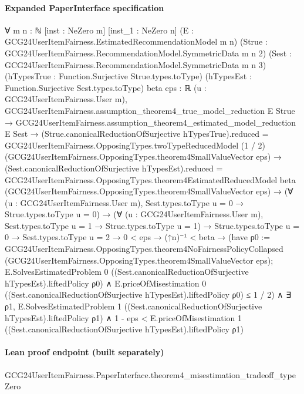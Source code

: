 \documentclass[10pt]{article}
\begin{document}
\paragraph{Expanded PaperInterface specification}
\begin{ReviewVerbatim}
∀ {m n : ℕ} [inst : NeZero m] [inst_1 : NeZero n] (E : GCG24UserItemFairness.EstimatedRecommendationModel m n)
  (Strue : GCG24UserItemFairness.RecommendationModel.SymmetricData m n 2)
  (Sest : GCG24UserItemFairness.RecommendationModel.SymmetricData m n 3)
  (hTypesTrue : Function.Surjective Strue.types.toType) (hTypesEst : Function.Surjective Sest.types.toType)
  {beta eps : ℝ} (u : GCG24UserItemFairness.User m),
  GCG24UserItemFairness.assumption_theorem4_true_model_reduction E Strue →
    GCG24UserItemFairness.assumption_theorem4_estimated_model_reduction E Sest →
      (Strue.canonicalReductionOfSurjective hTypesTrue).reduced =
          GCG24UserItemFairness.OpposingTypes.twoTypeReducedModel (1 / 2)
            (GCG24UserItemFairness.OpposingTypes.theorem4SmallValueVector eps) →
        (Sest.canonicalReductionOfSurjective hTypesEst).reduced =
            GCG24UserItemFairness.OpposingTypes.theorem4EstimatedReducedModel beta
              (GCG24UserItemFairness.OpposingTypes.theorem4SmallValueVector eps) →
          (∀ (u : GCG24UserItemFairness.User m), Sest.types.toType u = 0 → Strue.types.toType u = 0) →
            (∀ (u : GCG24UserItemFairness.User m), Sest.types.toType u = 1 → Strue.types.toType u = 1) →
              Strue.types.toType u = 0 →
                Sest.types.toType u = 2 →
                  0 < eps →
                    (↑n)⁻¹ < beta →
                      (have ρ0 :=
                          GCG24UserItemFairness.OpposingTypes.theorem4NoFairnessPolicyCollapsed
                            (GCG24UserItemFairness.OpposingTypes.theorem4SmallValueVector eps);
                        E.SolvesEstimatedProblem 0 ((Sest.canonicalReductionOfSurjective hTypesEst).liftedPolicy ρ0) ∧
                          E.priceOfMisestimation 0 ((Sest.canonicalReductionOfSurjective hTypesEst).liftedPolicy ρ0) ≤
                            1 / 2) ∧
                        ∃ ρ1,
                          E.SolvesEstimatedProblem 1 ((Sest.canonicalReductionOfSurjective hTypesEst).liftedPolicy ρ1) ∧
                            1 - eps <
                              E.priceOfMisestimation 1 ((Sest.canonicalReductionOfSurjective hTypesEst).liftedPolicy ρ1)
\end{ReviewVerbatim}

\paragraph{Lean proof endpoint (built separately)}\begin{ReviewVerbatim}
GCG24UserItemFairness.PaperInterface.theorem4_misestimation_tradeoff_typeZero
\end{ReviewVerbatim}
\end{document}
